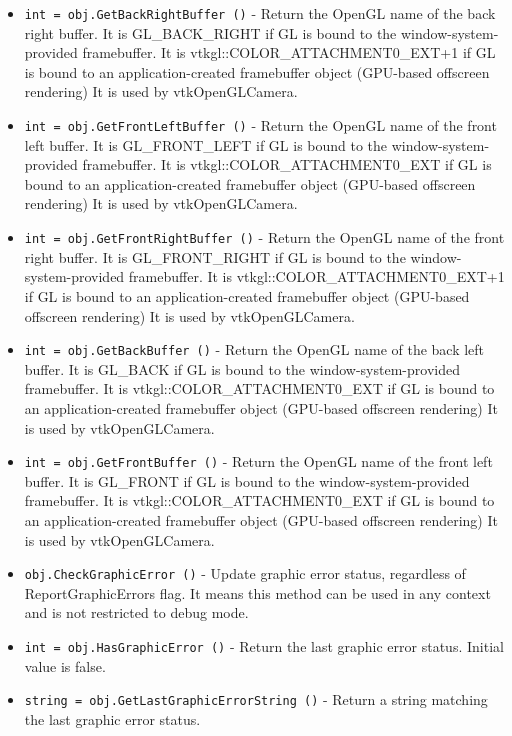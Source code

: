 \begin{itemize}
\item  \verb|int = obj.GetBackRightBuffer ()| -  Return the OpenGL name of the back right buffer.
 It is GL\_BACK\_RIGHT if GL is bound to the window-system-provided
 framebuffer. It is vtkgl::COLOR\_ATTACHMENT0\_EXT+1 if GL is bound to an
 application-created framebuffer object (GPU-based offscreen rendering)
 It is used by vtkOpenGLCamera.

\item  \verb|int = obj.GetFrontLeftBuffer ()| -  Return the OpenGL name of the front left buffer.
 It is GL\_FRONT\_LEFT if GL is bound to the window-system-provided
 framebuffer. It is vtkgl::COLOR\_ATTACHMENT0\_EXT if GL is bound to an
 application-created framebuffer object (GPU-based offscreen rendering)
 It is used by vtkOpenGLCamera.

\item  \verb|int = obj.GetFrontRightBuffer ()| -  Return the OpenGL name of the front right buffer.
 It is GL\_FRONT\_RIGHT if GL is bound to the window-system-provided
 framebuffer. It is vtkgl::COLOR\_ATTACHMENT0\_EXT+1 if GL is bound to an
 application-created framebuffer object (GPU-based offscreen rendering)
 It is used by vtkOpenGLCamera.

\item  \verb|int = obj.GetBackBuffer ()| -  Return the OpenGL name of the back left buffer.
 It is GL\_BACK if GL is bound to the window-system-provided
 framebuffer. It is vtkgl::COLOR\_ATTACHMENT0\_EXT if GL is bound to an
 application-created framebuffer object (GPU-based offscreen rendering)
 It is used by vtkOpenGLCamera.

\item  \verb|int = obj.GetFrontBuffer ()| -  Return the OpenGL name of the front left buffer.
 It is GL\_FRONT if GL is bound to the window-system-provided
 framebuffer. It is vtkgl::COLOR\_ATTACHMENT0\_EXT if GL is bound to an
 application-created framebuffer object (GPU-based offscreen rendering)
 It is used by vtkOpenGLCamera.

\item  \verb|obj.CheckGraphicError ()| -  Update graphic error status, regardless of ReportGraphicErrors flag.
 It means this method can be used in any context and is not restricted to
 debug mode.

\item  \verb|int = obj.HasGraphicError ()| -  Return the last graphic error status. Initial value is false.

\item  \verb|string = obj.GetLastGraphicErrorString ()| -  Return a string matching the last graphic error status.


\end{itemize}
